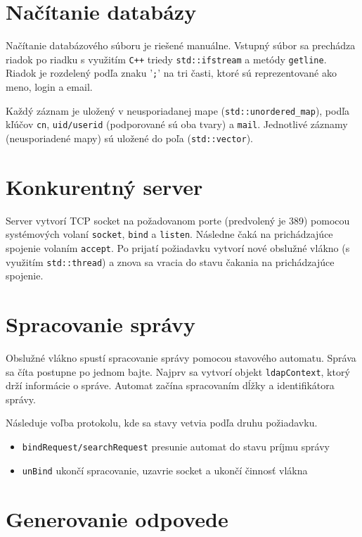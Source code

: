 \documentclass[12pt]{report}
\begin{document}
\section{Načítanie databázy}

Načítanie databázového súboru je riešené manuálne.
Vstupný súbor sa prechádza riadok po riadku s využitím \texttt{C++} triedy \texttt{std::ifstream}
a metódy \texttt{getline}. Riadok je rozdelený podľa znaku '\texttt{;}' na tri časti, ktoré sú
reprezentované ako meno, login a email.

Každý záznam je uložený v neusporiadanej mape (\texttt{std::unordered\_map}),
podľa kľúčov \texttt{cn}, \texttt{uid/userid} (podporované sú oba tvary) a \texttt{mail}.
Jednotlivé záznamy (neusporiadené mapy) sú uložené do poľa (\texttt{std::vector}).

\section{Konkurentný server}

Server vytvorí TCP socket na požadovanom porte (predvolený je 389) pomocou systémových volaní
\texttt{socket}, \texttt{bind} a \texttt{listen}.
Následne čaká na prichádzajúce spojenie volaním \texttt{accept}.
Po prijatí požiadavku vytvorí nové obslužné vlákno (s využitím \texttt{std::thread}) a znova sa
vracia do stavu čakania na prichádzajúce spojenie.

\section{Spracovanie správy}

Obslužné vlákno spustí spracovanie správy pomocou stavového automatu.
Správa sa číta postupne po jednom bajte.
Najprv sa vytvorí objekt \texttt{ldapContext}, ktorý drží informácie o správe.
Automat začína spracovaním dĺžky a identifikátora správy.

Následuje voľba protokolu, kde sa stavy vetvia podľa druhu požiadavku.
\begin{itemize}
    \item \texttt{bindRequest/searchRequest} presunie automat do stavu príjmu správy
    \item \texttt{unBind} ukončí spracovanie, uzavrie socket a ukončí činnosť vlákna
\end{itemize}

\section{Generovanie odpovede}
\end{document}

